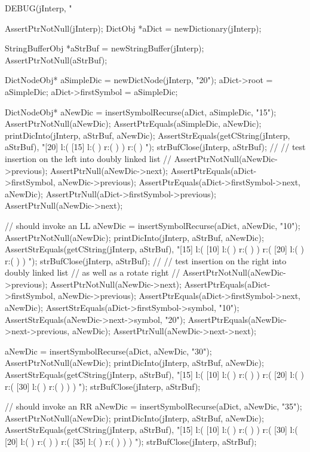 \startCTest
  DEBUG(jInterp, "\n%

  AssertPtrNotNull(jInterp);
  DictObj *aDict = newDictionary(jInterp);

  StringBufferObj *aStrBuf = newStringBuffer(jInterp);
  AssertPtrNotNull(aStrBuf);
  
  DictNodeObj* aSimpleDic = newDictNode(jInterp, "20");
  aDict->root             = aSimpleDic;
  aDict->firstSymbol      = aSimpleDic;

  DictNodeObj* aNewDic = insertSymbolRecurse(aDict, aSimpleDic, "15");
  AssertPtrNotNull(aNewDic);
  AssertPtrEquals(aSimpleDic, aNewDic);
  printDicInto(jInterp, aStrBuf, aNewDic);
  AssertStrEquals(getCString(jInterp, aStrBuf),
  "[20] l:( [15] l:(  ) r:(  )  ) r:(  ) ");
  strBufClose(jInterp, aStrBuf);
  //
  // test insertion on the left into doubly linked list
  //
  AssertPtrNotNull(aNewDic->previous);
  AssertPtrNull(aNewDic->next);
  AssertPtrEquals(aDict->firstSymbol, aNewDic->previous);
  AssertPtrEquals(aDict->firstSymbol->next, aNewDic);
  AssertPtrNull(aDict->firstSymbol->previous);
  AssertPtrNull(aNewDic->next);

  // should invoke an LL
  aNewDic = insertSymbolRecurse(aDict, aNewDic, "10");
  AssertPtrNotNull(aNewDic);
  printDicInto(jInterp, aStrBuf, aNewDic);
  AssertStrEquals(getCString(jInterp, aStrBuf),
  "[15] l:( [10] l:(  ) r:(  )  ) r:( [20] l:(  ) r:(  )  ) ");
  strBufClose(jInterp, aStrBuf);
  //
  // test insertion on the right into doubly linked list
  // as well as a rotate right
  //
  AssertPtrNotNull(aNewDic->previous);
  AssertPtrNotNull(aNewDic->next);
  AssertPtrEquals(aDict->firstSymbol, aNewDic->previous);
  AssertPtrEquals(aDict->firstSymbol->next, aNewDic);
  AssertStrEquals(aDict->firstSymbol->symbol, "10");
  AssertStrEquals(aNewDic->next->symbol, "20");
  AssertPtrEquals(aNewDic->next->previous, aNewDic);
  AssertPtrNull(aNewDic->next->next);

  aNewDic = insertSymbolRecurse(aDict, aNewDic, "30");
  AssertPtrNotNull(aNewDic);
  printDicInto(jInterp, aStrBuf, aNewDic);
  AssertStrEquals(getCString(jInterp, aStrBuf),
  "[15] l:( [10] l:(  ) r:(  )  ) r:( [20] l:(  ) r:( [30] l:(  ) r:(  )  )  ) ");
  strBufClose(jInterp, aStrBuf);
  
  // should invoke an RR
  aNewDic = insertSymbolRecurse(aDict, aNewDic, "35");
  AssertPtrNotNull(aNewDic);
  printDicInto(jInterp, aStrBuf, aNewDic);
  AssertStrEquals(getCString(jInterp, aStrBuf),
  "[15] l:( [10] l:(  ) r:(  )  ) r:( [30] l:( [20] l:(  ) r:(  )  ) r:( [35] l:(  ) r:(  )  )  ) ");
  strBufClose(jInterp, aStrBuf);

